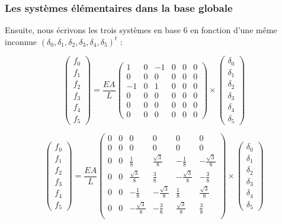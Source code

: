 \documentclass{beamer}
\begin{document}
\begin{frame}
\frametitle{Les systèmes élémentaires dans la base globale}
Ensuite, nous écrivons les trois systèmes en base 6 en fonction d'une même inconnue $(\delta_0,\delta_1,\delta_2,\delta_3,\delta_4,\delta_5)^t$ :

\[\left(\begin{array}{r}f_0\\ f_1\\f_2\\f_3\\f_4\\f_5 \end{array}\right) 
=\frac{EA}{L}
\left(\begin{array}{rrrrcc} 
1&0&-1&0&0&0\\
0&0&0&0&0&0\\
-1&0&1&0&0&0\\
0&0&0&0&0&0\\
0&0&0&0&0&0\\
0&0&0&0&0&0
\end{array}\right)\times
\left(\begin{array}{r} \delta_0\\ \delta_1\\ \delta_2\\ \delta_3\\ \delta_4\\ \delta_5  \end{array}\right) 
\]

\[\left(\begin{array}{r}f_0\\ f_1\\f_2\\f_3\\f_4\\f_5 \end{array}\right) 
=\frac{EA}{L}
\left(\begin{array}{ccrrrr} 
0&0&0&0&0&0\\
0&0&0&0&0&0\\
0&0&\frac 18&\frac{\sqrt 3}{8}&-\frac 18&-\frac{\sqrt 3}{8}\\
0&0&\frac{\sqrt 3}{8}&\frac 38&-\frac{\sqrt 3}{8}&-\frac 38\\
0&0&-\frac 18&-\frac{\sqrt 3}{8}&\frac 18&\frac{\sqrt 3}{8}\\
0&0&-\frac{\sqrt 3}{8}&-\frac 38&\frac{\sqrt 3}{8}&\frac 38\\
\end{array}\right)
\times
\left(\begin{array}{r} \delta_0\\ \delta_1\\ \delta_2\\ \delta_3\\ \delta_4\\ \delta_5   \end{array}\right)
\]
\end{frame}
\end{document}
